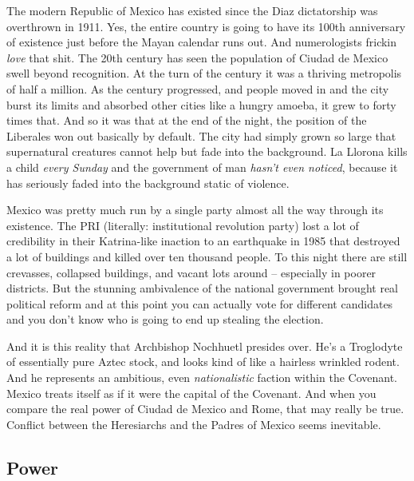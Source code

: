 The modern Republic of Mexico has existed since the Diaz dictatorship was overthrown in 1911. Yes, the entire country is going to have its 100th anniversary of existence just before the Mayan calendar runs out. And numerologists frickin \textit{love} that shit. The 20th century has seen the population of Ciudad de Mexico swell beyond recognition. At the turn of the century it was a thriving metropolis of half a million. As the century progressed, and people moved in and the city burst its limits and absorbed other cities like a hungry amoeba, it grew to forty times that. And so it was that at the end of the night, the position of the Liberales won out basically by default. The city had simply grown so large that supernatural creatures cannot help but fade into the background. La Llorona kills a child \textit{every Sunday} and the government of man \textit{hasn't even noticed}, because it has seriously faded into the background static of violence.

Mexico was pretty much run by a single party almost all the way through its existence. The PRI (literally: institutional revolution party) lost a lot of credibility in their Katrina-like inaction to an earthquake in 1985 that destroyed a lot of buildings and killed over ten thousand people. To this night there are still crevasses, collapsed buildings, and vacant lots around -- especially in poorer districts. But the stunning ambivalence of the national government brought real political reform and at this point you can actually vote for different candidates and you don't know who is going to end up stealing the election.

And it is this reality that Archbishop Nochhuetl presides over. He's a Troglodyte of essentially pure Aztec stock, and looks kind of like a hairless wrinkled rodent. And he represents an ambitious, even \textit{nationalistic} faction within the Covenant. Mexico treats itself as if it were the capital of the Covenant. And when you compare the real power of Ciudad de Mexico and Rome, that may really be true. Conflict between the Heresiarchs and the Padres of Mexico seems inevitable.

\subsection{Power}

